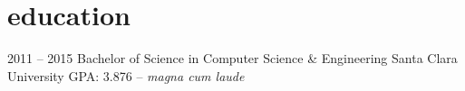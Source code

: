 \documentclass[]{friggeri-cv} %
\begin{document}
\begin{entrylist}
%


\end{entrylist}


\section{education}

\begin{entrylist}

\entry
{2011 -- 2015}
{Bachelor of Science {\normalfont in Computer Science \& Engineering}}
{Santa Clara University}
{GPA: 3.876 -- \emph{magna cum laude}}



\end{entrylist}
\end{document}
